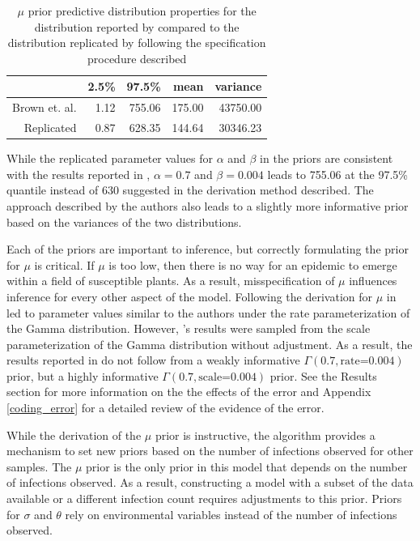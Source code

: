 \documentclass{uwstat572}
\begin{document}
\begin{table}[ht]
\centering
\begin{tabular}{rrrrr}
  \hline
 & 2.5\% & 97.5\% & mean & variance \\ 
  \hline
Brown et. al. & 1.12 & 755.06 & 175.00 & 43750.00 \\ 
  Replicated & 0.87 & 628.35 & 144.64 & 30346.23 \\ 
   \hline
\end{tabular}
\caption{$\mu$ prior predictive distribution properties for the distribution reported by \cite{Brown} compared to the distribution replicated by following the specification procedure described}
\label{table:mu_prior_quantile}
\end{table}

While the replicated parameter values for $\alpha$ and $\beta$ in the priors are consistent with the results reported in \citep{Brown}, $\alpha=0.7$ and $\beta=0.004$ leads to 755.06 at the 97.5\% quantile instead of 630 suggested in the derivation method described. 
The approach described by the authors also leads to a slightly more informative prior based on the variances of the two distributions. 

Each of the priors are important to inference, but correctly formulating the prior for $\mu$ is critical. 
If $\mu$ is too low, then there is no way for an epidemic to emerge within a field of susceptible plants. 
As a result, misspecification of $\mu$ influences inference for every other aspect of the model. 
Following the derivation for $\mu$ in \citet{Brown} led to parameter values similar to the authors under the rate parameterization of the Gamma distribution. 
However, \citep{Brown}'s results were sampled from the scale parameterization of the Gamma distribution without adjustment.
As a result, the results reported in \citet{Brown} do not follow from a weakly informative $\Gamma(0.7, \text{rate=}0.004)$ prior, but a highly informative $\Gamma(0.7, \text{scale=}0.004)$ prior. 
See the Results section for more information on the the effects of the error and Appendix \ref{coding_error} for a detailed review of the evidence of the error.  

While the derivation of the $\mu$ prior is instructive, the algorithm provides a mechanism to set new priors based on the number of infections observed for other samples. 
The $\mu$ prior is the only prior in this model that depends on the number of infections observed. 
As a result, constructing a model with a subset of the data available or a different infection count requires adjustments to this prior. 
Priors for $\sigma$ and $\theta$ rely on environmental variables instead of the number of infections observed. 
\end{document}
